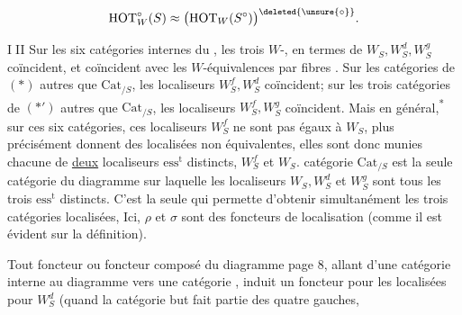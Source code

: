 \[
 \mathrm{HOT}_W^\circ(S)\approx\bigl(\mathrm{HOT}_W(S^\circ)\bigr)^{\deleted{\unsure{\circ}}}.
\]

\textcircled{III} Sur les six catégories internes du , les trois   $W$-, en termes de $W_S,W_S^d,W_S^g$ coïncident, et coïncident avec les $W$-équivalences par fibres . Sur les   catégories de $(*)$ autres que $\mathrm{Cat}_{/S}$, les localiseurs $W_S^f,W_S^d$ coïncident\textup{;} sur les trois catégories de $(*')$ autres que $\mathrm{Cat}_{/S}$, les localiseurs $W_S^f,W_S^g$ coïncident. Mais en général,\textsuperscript{*}
sur ces six catégories,  ces localiseurs $W_S^f$ ne sont pas égaux à $W_S$, plus précisément donnent des localisées non équivalentes,  elles sont donc munies chacune de \uline{deux} localiseurs $\mathrm{ess}^{\mathrm{t}}$ distincts, $W_S^f$ et $W_S$.  catégorie $\mathrm{Cat}_{/S}$ est la seule catégorie du diagramme sur laquelle les localiseurs $W_S,W_S^d$ et $W_S^g$ sont tous les trois $\mathrm{ess}^{\mathrm{t}}$ distincts. C'est la seule qui permette d'obtenir simultanément les trois catégories localisées, 
Ici, $\rho$ et $\sigma$ sont des foncteurs de localisation (comme il est évident sur la définition).

Tout foncteur ou foncteur composé du diagramme page 8, allant d'une catégorie interne au diagramme vers une catégorie , induit un foncteur pour les localisées pour $W_S^d$ (quand la catégorie but fait partie des quatre gauches,
